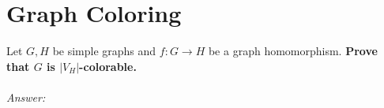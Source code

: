 \documentclass{article}
\begin{document}
  \section{Graph Coloring}
    Let $G, H$ be simple graphs and $f:G\to H$ be a graph homomorphism.
    \textbf{Prove that $G$ is $|V_H|$-colorable.}
  \\\\
  \textit{Answer:}
    

    
\end{document}
